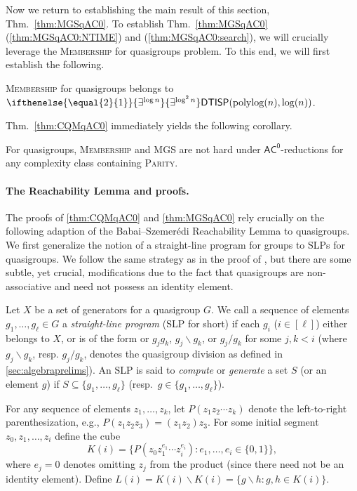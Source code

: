 \documentclass{theoretics}
\newcommand{\algprobm}[1]{\textsc{#1}\xspace}
\newcommand{\betacc}[1]{\ifthenelse{\equal{#1}{1}}{\exists^{\log n}}{\exists^{\log^{#1}n}}} %
\newcommand{\Thm}[1]{Thm.~\ref{#1}\xspace}
\newcommand*{\ComplexityClass}[1]{\ensuremath{\mathsf{#1}}\xspace}
\newcommand{\DTISP}{\ComplexityClass{DTISP}}
\newcommand{\DTISPpll}{\ensuremath{\DTISP(\mathrm{polylog}(n),\mathrm{log}(n))}\xspace}
\newcommand{\ACz}{\ComplexityClass{AC^0}}
\begin{document}
Now we return to establishing the main result of this section, \Thm{thm:MGSqAC0}. To establish \Thm{thm:MGSqAC0}(\ref{thm:MGSqAC0:NTIME}) and (\ref{thm:MGSqAC0:search}), we will crucially leverage the \algprobm{Membership} for quasigroups problem. To this end, we will first establish the following.
\begin{theorem}\label{thm:CQMqAC0}
\algprobm{Membership} for quasigroups belongs to $\betacc{2}\DTISPpll$.
\end{theorem}

\Thm{thm:CQMqAC0} immediately yields the following corollary. 

\begin{corollary}
For quasigroups, \algprobm{Membership} and \algprobm{MGS} are not hard under $\ACz$-reductions for any complexity class containing \algprobm{Parity}.
\end{corollary}


\paragraph{The Reachability Lemma and proofs.} 
The proofs of \cref{thm:CQMqAC0} and \cref{thm:MGSqAC0} rely crucially on the following adaption of the Babai--Szemer\'edi  Reachability Lemma \cite[Theorem~3.1]{BabaiSzemeredi} to quasigroups. We first generalize the notion of a straight-line program for groups \cite{BabaiSzemeredi} to SLPs for quasigroups. We follow the same strategy as in the proof of \cite[Theorem~3.1]{BabaiSzemeredi}, but there are some subtle, yet crucial, modifications due to the fact that quasigroups are non-associative and need not possess an identity element.

Let $X$ be a set of generators for a quasigroup $G$. We call a sequence of elements $g_{1}, \ldots, g_{\ell} \in G$ a \textit{straight-line program} (SLP for short) if each $g_{i}$ ($i \in [\ell]$) either belongs to $X$, or is of the form or $g_{j}g_{k}$, $g_{j}\backslash g_{k}$, or $g_{j}/ g_{k}$ for some $j, k < i$ (where $g_{j}\backslash g_{k}$, resp. $g_{j}/ g_{k}$, denotes the quasigroup division as defined in \cref{sec:algebraprelims}). An SLP is said to \emph{compute} or \emph{generate} a set $S$ (or an element $g$) if $S \subseteq \{g_1, \dots, g_\ell\}$ (resp.\ $g\in\{g_1, \dots, g_\ell\}$).

For any sequence of elements $z_1,\dotsc,z_k$, let $P(z_1 z_2 \dotsb z_k)$ denote the left-to-right parenthesization, e.g., $P(z_1 z_2 z_3) = (z_1 z_2) z_3$. For some initial segment $z_0, z_{1}, \ldots, z_{i}$ define the cube
\[
K(i) = \{ P(z_0z_{1}^{e_{1}} \cdots z_{i}^{e_{i}}) : e_{1}, \ldots, e_{i} \in \{0,1\}\},
\]
where $e_j=0$ denotes omitting $z_j$ from the product (since there need not be an identity element).
 Define $L(i) = K(i)\backslash K(i) = \{ g\backslash h : g,h \in K(i)\}$.
%
\end{document}
